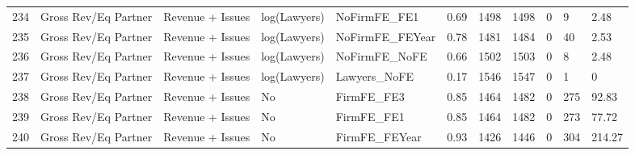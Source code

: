\documentclass{article}
\begin{document}
\begin{table}[H]
\begin{tabular}{rllllllllll}
  234 & Gross Rev/Eq Partner & Revenue + Issues & log(Lawyers) & NoFirmFE\_FE1 & 0.69 & 1498 & 1498 & 0 & 9 & 2.48 \\ 
  235 & Gross Rev/Eq Partner & Revenue + Issues & log(Lawyers) & NoFirmFE\_FEYear & 0.78 & 1481 & 1484 & 0 & 40 & 2.53 \\ 
  236 & Gross Rev/Eq Partner & Revenue + Issues & log(Lawyers) & NoFirmFE\_NoFE & 0.66 & 1502 & 1503 & 0 & 8 & 2.48 \\ 
  237 & Gross Rev/Eq Partner & Revenue + Issues & log(Lawyers) & Lawyers\_NoFE & 0.17 & 1546 & 1547 & 0 & 1 & 0 \\ 
  238 & Gross Rev/Eq Partner & Revenue + Issues & No & FirmFE\_FE3 & 0.85 & 1464 & 1482 & 0 & 275 & 92.83 \\ 
  239 & Gross Rev/Eq Partner & Revenue + Issues & No & FirmFE\_FE1 & 0.85 & 1464 & 1482 & 0 & 273 & 77.72 \\ 
  240 & Gross Rev/Eq Partner & Revenue + Issues & No & FirmFE\_FEYear & 0.93 & 1426 & 1446 & 0 & 304 & 214.27 \\ 
   \hline
\end{tabular}
\end{table}
\end{document}
